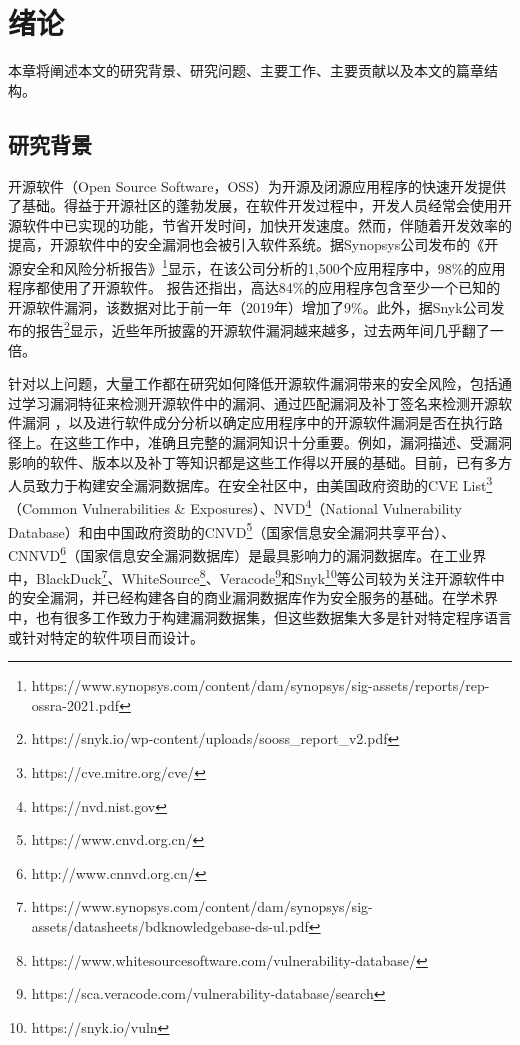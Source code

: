 \chapter{绪论}

本章将阐述本文的研究背景、研究问题、主要工作、主要贡献以及本文的篇章结构。

\section{研究背景}

开源软件（Open Source Software，OSS）为开源及闭源应用程序的快速开发提供了基础。得益于开源社区的蓬勃发展，在软件开发过程中，开发人员经常会使用开源软件中已实现的功能，节省开发时间，加快开发速度\cite{Wang2020empirical}。然而，伴随着开发效率的提高，开源软件中的安全漏洞也会被引入软件系统\cite{2何熙巽2020软件供应链安全综述,3刘剑2018软件与网络安全研究综述}。据Synopsys公司发布的《开源安全和风险分析报告》\footnote{https://www.synopsys.com/content/dam/synopsys/sig-assets/reports/rep-ossra-2021.pdf}显示，在该公司分析的1,500个应用程序中，98\%的应用程序都使用了开源软件。
报告还指出，高达84\%的应用程序包含至少一个已知的开源软件漏洞，该数据对比于前一年（2019年）增加了9\%。此外，据Snyk公司发布的报告\footnote{https://snyk.io/wp-content/uploads/sooss\_report\_v2.pdf}显示，近些年所披露的开源软件漏洞越来越多，过去两年间几乎翻了一倍。

针对以上问题，大量工作都在研究如何降低开源软件漏洞带来的安全风险，包括通过学习漏洞特征来检测开源软件中的漏洞\cite{li2016vulpecker,li2018vuldeepecker,zhou2019devign,jimenez2019importance}、通过匹配漏洞及补丁签名来检测开源软件漏洞\cite{jang2012redebug, kim2017vuddy, xu2020patch, xiao2020mvp, cui2020vuldetector}%
，以及进行软件成分分析以确定应用程序中的开源软件漏洞是否在执行路径上\cite{pashchenko2018vulnerable, ponta2020detection, pashchenko2020vuln4real, Wang2020empirical}。在这些工作中，准确且完整的漏洞知识十分重要。例如，漏洞描述、受漏洞影响的软件、版本以及补丁等知识都是这些工作得以开展的基础。目前，已有多方人员致力于构建安全漏洞数据库。在安全社区中，由美国政府资助的CVE List\footnote{https://cve.mitre.org/cve/}（Common Vulnerabilities \& Exposures）、NVD\footnote{https://nvd.nist.gov}（National Vulnerability Database）和由中国政府资助的CNVD\footnote{https://www.cnvd.org.cn/}（国家信息安全漏洞共享平台）、CNNVD\footnote{http://www.cnnvd.org.cn/}（国家信息安全漏洞数据库）是最具影响力的漏洞数据库。在工业界中，BlackDuck\footnote{https://www.synopsys.com/content/dam/synopsys/sig-assets/datasheets/bdknowledgebase-ds-ul.pdf}、WhiteSource\footnote{https://www.whitesourcesoftware.com/vulnerability-database/}、Veracode\footnote{https://sca.veracode.com/vulnerability-database/search}和Snyk\footnote{https://snyk.io/vuln}等公司较为关注开源软件中的安全漏洞，并已经构建各自的商业漏洞数据库作为安全服务的基础。在学术界中，也有很多工作致力于构建漏洞数据集\cite{ponta2019manually,fan2020ac,jimenez2018enabling,gkortzis2018vulinoss,namrud2019androvul}，但这些数据集大多是针对特定程序语言或针对特定的软件项目而设计。


